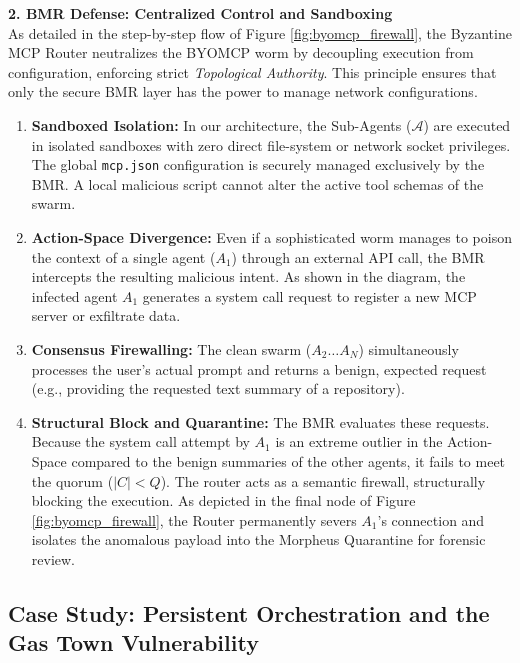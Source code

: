 \documentclass[a4paper,11pt,twocolumn]{article}
\theoremstyle{definition}
\theoremstyle{plain}
\begin{document}
\textbf{2. BMR Defense: Centralized Control and Sandboxing} \\
As detailed in the step-by-step flow of Figure \ref{fig:byomcp_firewall}, the Byzantine MCP Router neutralizes the BYOMCP worm by decoupling execution from configuration, enforcing strict \textit{Topological Authority}. This principle ensures that only the secure BMR layer has the power to manage network configurations.

\begin{enumerate}
    \item \textbf{Sandboxed Isolation:} In our architecture, the Sub-Agents ($\mathcal{A}$) are executed in isolated sandboxes with zero direct file-system or network socket privileges. The global \texttt{mcp.json} configuration is securely managed exclusively by the BMR. A local malicious script cannot alter the active tool schemas of the swarm.
    \item \textbf{Action-Space Divergence:} Even if a sophisticated worm manages to poison the context of a single agent ($A_1$) through an external API call, the BMR intercepts the resulting malicious intent. As shown in the diagram, the infected agent $A_1$ generates a system call request to register a new MCP server or exfiltrate data.

\pagebreak

    \item \textbf{Consensus Firewalling:} The clean swarm ($A_2 \dots A_N$) simultaneously processes the user's actual prompt and returns a benign, expected request (e.g., providing the requested text summary of a repository). 
    \item \textbf{Structural Block and Quarantine:} The BMR evaluates these requests. Because the system call attempt by $A_1$ is an extreme outlier in the Action-Space compared to the benign summaries of the other agents, it fails to meet the quorum ($|C| < Q$). The router acts as a semantic firewall, structurally blocking the execution. As depicted in the final node of Figure \ref{fig:byomcp_firewall}, the Router permanently severs $A_1$'s connection and isolates the anomalous payload into the Morpheus Quarantine for forensic review.
\end{enumerate}

\subsection{Case Study: Persistent Orchestration and the Gas Town Vulnerability}
\end{document}
